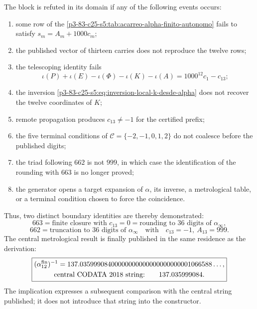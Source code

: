 \begin{remark}
The block is refuted in its domain if any of the following events occurs:
\begin{enumerate}
 \item some row of the \cref{p3-83-c25-s5:tab:acarreo-alpha-finito-autonomo}
       fails to satisfy \(s_m=A_m+1000c_m\);
 \item the published vector of thirteen carries does not reproduce the twelve rows;
 \item the telescoping identity fails
       \[
       \iota(P)+\iota(E)-\iota(\Phi)-\iota(K)-\iota(A)
       =1000^{12}c_1-c_{13};
       \]
 \item the inversion \eqref{p3-83-c25-s5:eq:inversion-local-k-desde-alpha} does not recover
       the twelve coordinates of \(K\);
 \item remote propagation produces \(c_{13}\neq-1\) for the certified
       prefix;
 \item the five terminal conditions of
       \(\mathcal C=\{-2,-1,0,1,2\}\) do not coalesce before the published
       digits;
 \item the triad following \(662\) is not \(999\), in which case the
       identification of the rounding with \(663\) is no longer proved;
 \item the generator opens a target expansion of \(\alpha\), its inverse,
       a metrological table, or a terminal condition chosen to force
       the coincidence.
\end{enumerate}
\end{remark}

Thus, two distinct boundary identities are thereby demonstrated:
\[
 \boxed{
 663=\text{finite closure with }c_{13}=0
     =\text{rounding to 36 digits of }\alpha_\infty,}
\]
\[
 \boxed{
 662=\text{truncation to 36 digits of }\alpha_\infty
 \quad\text{with}\quad c_{13}=-1,\ A_{13}=999.}
\]
The central metrological result is finally published in the same residence as the derivation:
\begin{equation}
 \boxed{
 \begin{gathered}
  (\alpha_{12}^{\rm fin})^{-1}
  =137.03599908400000000000000000000001066588\ldots,\\
  \text{central CODATA 2018 string:}\qquad137.035999084.
 \end{gathered}}
 \label{p3-83-c25-s5:eq:resultado-final-alpha-codata-2018}
\end{equation}
The implication expresses a subsequent comparison with the central string published; it does not introduce that string into the constructor.
